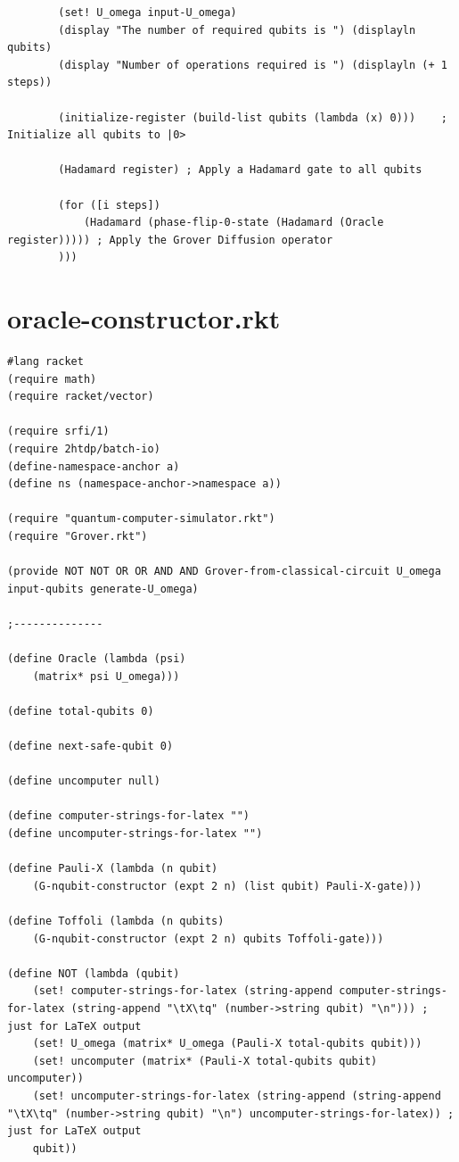 \documentclass[11pt]{report}
\newcommand{\?}{\stackrel{?}{=}}
\begin{document}
\begin{appendix}
\begin{verbatim}
		(set! U_omega input-U_omega)
		(display "The number of required qubits is ") (displayln qubits)
		(display "Number of operations required is ") (displayln (+ 1 steps))

		(initialize-register (build-list qubits (lambda (x) 0)))	; Initialize all qubits to |0>

		(Hadamard register)	; Apply a Hadamard gate to all qubits

		(for ([i steps])
			(Hadamard (phase-flip-0-state (Hadamard (Oracle register))))) ; Apply the Grover Diffusion operator
		)))
	\end{verbatim}
	\chapter{oracle-constructor.rkt}
	\begin{verbatim}
#lang racket
(require math)
(require racket/vector)

(require srfi/1)
(require 2htdp/batch-io)
(define-namespace-anchor a)
(define ns (namespace-anchor->namespace a))

(require "quantum-computer-simulator.rkt")
(require "Grover.rkt")

(provide NOT NOT OR OR AND AND Grover-from-classical-circuit U_omega input-qubits generate-U_omega)

;--------------

(define Oracle (lambda (psi)
	(matrix* psi U_omega)))

(define total-qubits 0)

(define next-safe-qubit 0)

(define uncomputer null)

(define computer-strings-for-latex "")
(define uncomputer-strings-for-latex "")

(define Pauli-X (lambda (n qubit)
	(G-nqubit-constructor (expt 2 n) (list qubit) Pauli-X-gate)))

(define Toffoli (lambda (n qubits)
	(G-nqubit-constructor (expt 2 n) qubits Toffoli-gate)))

(define NOT (lambda (qubit)
	(set! computer-strings-for-latex (string-append computer-strings-for-latex (string-append "\tX\tq" (number->string qubit) "\n"))) ; just for LaTeX output
	(set! U_omega (matrix* U_omega (Pauli-X total-qubits qubit)))
	(set! uncomputer (matrix* (Pauli-X total-qubits qubit) uncomputer))
	(set! uncomputer-strings-for-latex (string-append (string-append "\tX\tq" (number->string qubit) "\n") uncomputer-strings-for-latex)) ; just for LaTeX output
	qubit))


\end{verbatim}
\end{appendix}
\end{document}
